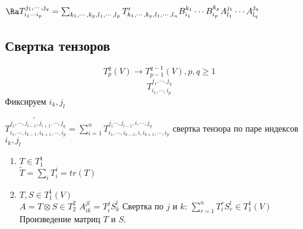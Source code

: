 $\Ra  T_{i_1 \cdots i_p}^{j_1, \cdots, j_q} = \sum_{k_1,\cdots, k_p, l_1, \cdots, l_p}T'_{k_1, \cdots, k_p, l_1, \cdots, l_n}B_{i_1}^{k_1} \cdots B_{i_p}^{k_p}A_{l_1}^{j_1} \cdots A_{l_q}^{j_q}$

\subsection{Свертка тензоров}
$$T_{p}^{q}(V) \to T^{q - 1}_{p - 1}(V), p, q \ge 1$$
$$T_{i_1, \cdots, i_p}^{j_1, \cdots, j_q}$$
Фиксируем $i_k, j_l$\\
\begin{Def}
$\widetilde{T_{i_1, \cdots, i_{k - 1}, i_{k + 1}, \cdots, i_p}^{j_1, \cdots, j_{l - 1}, j_{l + 1}, \cdots, j_q}} = \sum_{i = 1}^{n}T_{i_1, \cdots, i_{k - 1}, i, i_{k + 1}, \cdots, i_p}^{j_1\cdots, j_{l - 1}, i, \cdots, j_{q}}$
свертка тензора по паре индексов $i_k, j_l$\\
\end{Def}

\begin{exmp}\hfill
\begin{enumerate}
\item
$T \in T_{1}^{1}$\\
$\widetilde{T} = \sum_{i}T_{i}^{i} = tr(T)$  
\item
$T, S \in T_{1}^{1}(V)$\\
$A = T \otimes S \in T^2_2$
$A^{jl}_{ik} = T_i^jS_k^l$
Свертка по $j$ и $k$: $\sum_{r = 1}^{n}T_i^rS^l_r \in T^{1}_1(V)$
Произведение матриц $T$ и $S$.

\end{enumerate}
\end{exmp}